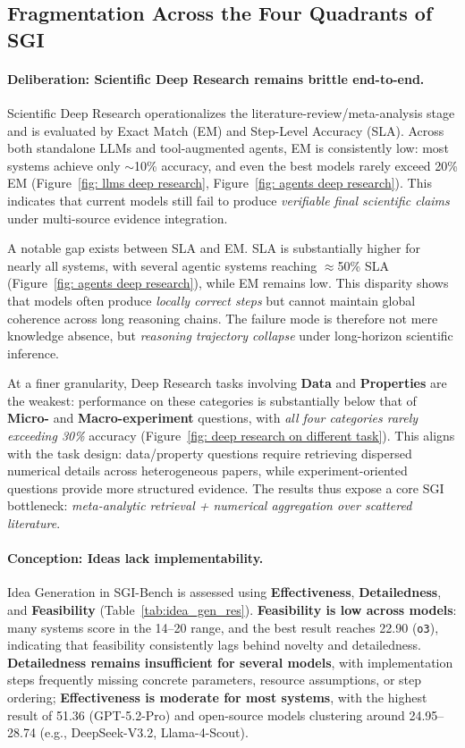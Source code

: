 \subsection{Fragmentation Across the Four Quadrants of SGI}

\paragraph{Deliberation: Scientific Deep Research remains brittle end-to-end.}
Scientific Deep Research operationalizes the literature-review/meta-analysis stage and is evaluated by Exact Match (EM) and Step-Level Accuracy (SLA). Across both standalone LLMs and tool-augmented agents, EM is consistently low: most systems achieve only $\sim$10\% accuracy, and even the best models rarely exceed 20\% EM (Figure~\ref{fig: llms deep research}, Figure~\ref{fig: agents deep research}). This indicates that current models still fail to produce \emph{verifiable final scientific claims} under multi-source evidence integration.

A notable gap exists between SLA and EM. SLA is substantially higher for nearly all systems, with several agentic systems reaching $\approx$50\% SLA (Figure~\ref{fig: agents deep research}), while EM remains low. This disparity shows that models often produce \emph{locally correct steps} but cannot maintain global coherence across long reasoning chains. The failure mode is therefore not mere knowledge absence, but \emph{reasoning trajectory collapse} under long-horizon scientific inference.

At a finer granularity, Deep Research tasks involving \textbf{Data} and \textbf{Properties} are the weakest: performance on these categories is substantially below that of \textbf{Micro-} and \textbf{Macro-experiment} questions, with \emph{all four categories rarely exceeding 30\%} accuracy (Figure~\ref{fig: deep research on different task}). This aligns with the task design: data/property questions require retrieving dispersed numerical details across heterogeneous papers, while experiment-oriented questions provide more structured evidence. The results thus expose a core SGI bottleneck: \emph{meta-analytic retrieval + numerical aggregation over scattered literature}.

\paragraph{Conception: Ideas lack implementability.}
Idea Generation in SGI-Bench is assessed using \textbf{Effectiveness}, \textbf{Detailedness}, and \textbf{Feasibility} (Table~\ref{tab:idea_gen_res}). \textbf{Feasibility is low across models}: many systems score in the 14–20 range, and the best result reaches 22.90 (\texttt{o3}), indicating that feasibility consistently lags behind novelty and detailedness. \textbf{Detailedness remains insufficient for several models}, with implementation steps frequently missing concrete parameters, resource assumptions, or step ordering; \textbf{Effectiveness is moderate for most systems}, with the highest result of 51.36 (GPT-5.2-Pro) and open-source models clustering around 24.95–28.74 (e.g., DeepSeek-V3.2, Llama-4-Scout).

